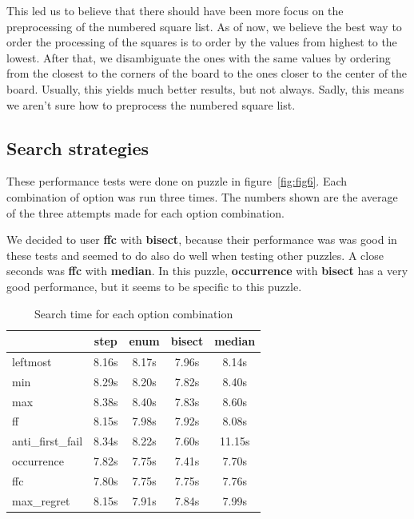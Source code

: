 \documentclass[runningheads]{llncs}
\begin{document}
This led us to believe that there should have been more focus on the preprocessing
of the numbered square list. As of now, we believe the best way to order the
processing of the squares is to order by the values from highest to the lowest.
After that, we disambiguate the ones with the same values by ordering
from the closest to the corners of the board to the ones closer to the center of
the board. Usually, this yields much better results, but not always. Sadly,
this means we aren't sure how to preprocess the numbered square list.

\subsection{Search strategies}
These performance tests were done on puzzle in figure~\ref{fig:fig6}. Each combination
of option was run three times. The numbers shown are the average of the three
attempts made for each option combination.

We decided to user \textbf{ffc} with \textbf{bisect}, because their performance
was was good in these tests and seemed to do also do well when testing other
puzzles. A close seconds was \textbf{ffc} with \textbf{median}. In this puzzle,
\textbf{occurrence} with \textbf{bisect} has a very good performance, but it
seems to be specific to this puzzle.

\begin{table}
  \begin{center}
    \caption{Search time for each option combination}
    \label{tab:table1}
    \begin{tabular}{l|c|c|c|c}
          & step & enum & bisect & median\\
      \hline
        leftmost        & 8.16s & 8.17s & 7.96s  & 8.14s  \\
      \hline
        min             & 8.29s & 8.20s & 7.82s  & 8.40s  \\
      \hline
        max             & 8.38s & 8.40s & 7.83s  & 8.60s  \\
      \hline
        ff              & 8.15s & 7.98s & 7.92s  & 8.08s  \\
      \hline
        anti\_first\_fail & 8.34s & 8.22s & 7.60s  & 11.15s \\
      \hline
        occurrence      & 7.82s & 7.75s & 7.41s  & 7.70s  \\
      \hline
        ffc             & 7.80s & 7.75s & 7.75s  & 7.76s  \\
      \hline
        max\_regret      & 8.15s & 7.91s & 7.84s  & 7.99s  \\
    \end{tabular}
  \end{center}
\end{table}
\end{document}
